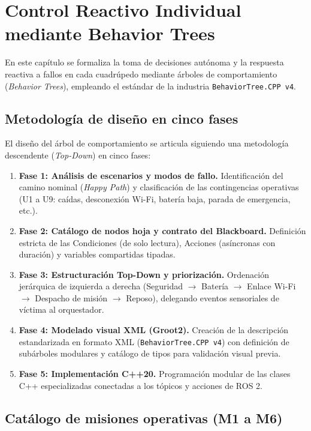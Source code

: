 \chapter{Control Reactivo Individual mediante Behavior Trees}
\label{chap:behavior_trees}

En este capítulo se formaliza la toma de decisiones autónoma y la respuesta reactiva a fallos en cada cuadrúpedo mediante árboles de comportamiento (\textit{Behavior Trees}), empleando el estándar de la industria \texttt{BehaviorTree.CPP v4}.

\section{Metodología de diseño en cinco fases}
\label{sec:metodologia_bt}

El diseño del árbol de comportamiento se articula siguiendo una metodología descendente (\textit{Top-Down}) en cinco fases:

\begin{enumerate}
    \item \textbf{Fase 1: Análisis de escenarios y modos de fallo.} Identificación del camino nominal (\textit{Happy Path}) y clasificación de las contingencias operativas (U1 a U9: caídas, desconexión Wi-Fi, batería baja, parada de emergencia, etc.).
    \item \textbf{Fase 2: Catálogo de nodos hoja y contrato del Blackboard.} Definición estricta de las Condiciones (de solo lectura), Acciones (asíncronas con duración) y variables compartidas tipadas.
    \item \textbf{Fase 3: Estructuración Top-Down y priorización.} Ordenación jerárquica de izquierda a derecha (Seguridad $\rightarrow$ Batería $\rightarrow$ Enlace Wi-Fi $\rightarrow$ Despacho de misión $\rightarrow$ Reposo), delegando eventos sensoriales de víctima al orquestador.
    \item \textbf{Fase 4: Modelado visual XML (Groot2).} Creación de la descripción estandarizada en formato XML (\texttt{BehaviorTree.CPP v4}) con definición de subárboles modulares y catálogo de tipos para validación visual previa.
    \item \textbf{Fase 5: Implementación C++20.} Programación modular de las clases C++ especializadas conectadas a los tópicos y acciones de ROS 2.
\end{enumerate}

\section{Catálogo de misiones operativas (M1 a M6)}
\label{sec:catalogo_misiones}

